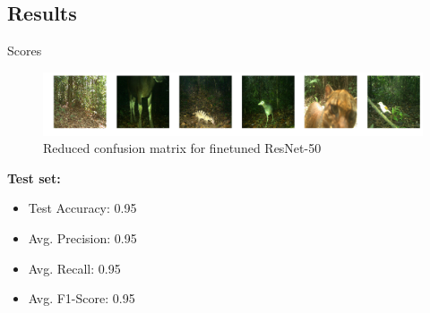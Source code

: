 \documentclass[10pt]{beamer}
\begin{document}
\subsection{Results}

\begin{frame}{Scores}
	\centering
	\begin{minipage}[r]{0.58\linewidth}
		\begin{figure}
			\hfill
			\hspace*{.5cm}\includegraphics[width=.8\columnwidth]{images/images_below.png}
			\caption{Reduced confusion matrix for finetuned ResNet-50}
		\end{figure}
	\end{minipage}
	\begin{minipage}[c]{0.38\linewidth}
		\textbf{Test set:}
		\begin{itemize}
			\item Test Accuracy: 0.95
			\item Avg. Precision:  0.95
			\item Avg. Recall: 0.95
			\item Avg. F1-Score: 0.95
		\end{itemize}
	\end{minipage}
\end{frame}
\end{document}
